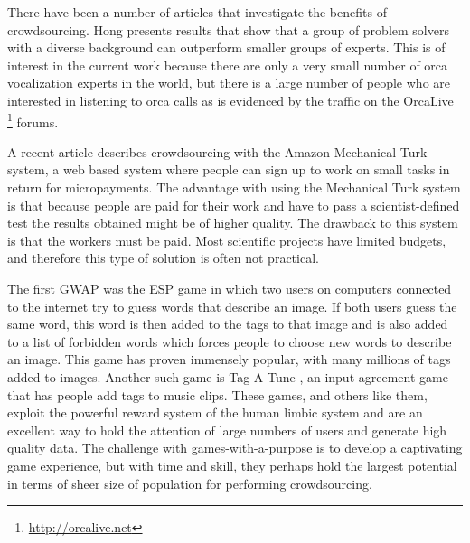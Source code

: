 There have been a number of articles that investigate the benefits of
crowdsourcing.  Hong \cite{hong04crowdsourcing} presents results that
show that a group of problem solvers with a diverse background can
outperform smaller groups of experts.  This is of interest in the
current work because there are only a very small number of orca
vocalization experts in the world, but there is a large number of
people who are interested in listening to orca calls as is evidenced
by the traffic on the OrcaLive \footnote{\url{http://orcalive.net}}
forums.

A recent article \cite{kittur08crowdsourcing} describes crowdsourcing
with the Amazon Mechanical Turk system, a web based system where
people can sign up to work on small tasks in return for micropayments.
The advantage with using the Mechanical Turk system is that because
people are paid for their work and have to pass a scientist-defined
test the results obtained might be of higher quality.  The drawback to
this system is that the workers must be paid.  Most scientific
projects have limited budgets, and therefore this type of solution is
often not practical.

The first GWAP was the ESP game \cite{vonahn2004labelling} in which
two users on computers connected to the internet try to guess words
that describe an image.  If both users guess the same word, this word
is then added to the tags to that image and is also added to a list of
forbidden words which forces people to choose new words to describe an
image.  This game has proven immensely popular, with many millions of
tags added to images.  Another such game is Tag-A-Tune
\cite{law2009input}, an input agreement game that has people add tags
to music clips.  These games, and others like them, exploit the
powerful reward system of the human limbic system and are an excellent
way to hold the attention of large numbers of users and generate high
quality data.  The challenge with games-with-a-purpose is to develop a
captivating game experience, but with time and skill, they perhaps
hold the largest potential in terms of sheer size of population for
performing crowdsourcing.

